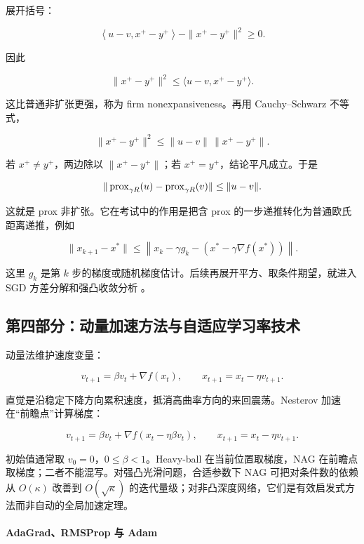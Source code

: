 \documentclass[11pt]{ctexart}
\begin{document}
展开括号：

\[
  \left\langle
    u-v,
    x^+-y^+
  \right\rangle
  -
  \|x^+-y^+\|^2
  \ge0.
\]

因此

\[
  \|x^+-y^+\|^2
  \le
  \langle u-v,x^+-y^+\rangle.
\]

这比普通非扩张更强，称为 firm nonexpansiveness。再用 Cauchy--Schwarz 不等式，

\[
  \|x^+-y^+\|^2
  \le
  \|u-v\|\,\|x^+-y^+\|.
\]

若 \(x^+\ne y^+\)，两边除以 \(\|x^+-y^+\|\)；若 \(x^+=y^+\)，结论平凡成立。于是

\[
  \|\operatorname{prox}_{\gamma R}(u)-\operatorname{prox}_{\gamma R}(v)\|
  \le
  \|u-v\|.
\]

这就是 prox 非扩张。它在考试中的作用是把含 prox 的一步递推转化为普通欧氏距离递推，例如

\[
  \|x_{k+1}-x^*\|
  \le
  \left\|
    x_k-\gamma g_k
    -
    \left(x^*-\gamma\nabla f(x^*)\right)
  \right\|.
\]

这里 \(g_k\) 是第 \(k\) 步的梯度或随机梯度估计。后续再展开平方、取条件期望，就进入 SGD 方差分解和强凸收敛分析 \parencite{beck2017first,nesterov2018convex}。

\subsection{第四部分：动量加速方法与自适应学习率技术}

动量法维护速度变量：

\[
  v_{t+1}=\beta v_t+\nabla f(x_t),
  \qquad
  x_{t+1}=x_t-\eta v_{t+1}.
\]

直觉是沿稳定下降方向累积速度，抵消高曲率方向的来回震荡。Nesterov 加速在“前瞻点”计算梯度：

\[
  v_{t+1}
  =
  \beta v_t+\nabla f(x_t-\eta\beta v_t),
  \qquad
  x_{t+1}=x_t-\eta v_{t+1}.
\]

\begin{remark}[动量与加速的边界]
初始值通常取 \(v_0=0\)，\(0\le\beta<1\)。Heavy-ball 在当前位置取梯度，NAG 在前瞻点取梯度；二者不能混写。对强凸光滑问题，合适参数下 NAG 可把对条件数的依赖从 \(O(\kappa)\) 改善到 \(O(\sqrt{\kappa})\) 的迭代量级；对非凸深度网络，它们是有效启发式方法而非自动的全局加速定理。
\end{remark}

\paragraph{AdaGrad、RMSProp 与 Adam}
\end{document}
